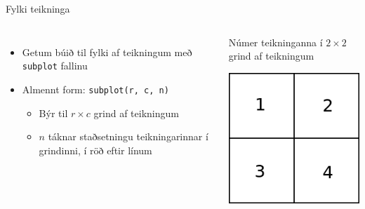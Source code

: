 \documentclass[handout]{beamer}
\begin{document}
\begin{frame}{Fylki teikninga}
\begin{columns}
\begin{itemize}
 \item Getum búið til fylki af teikningum með \texttt{subplot} fallinu
 \item Almennt form: \texttt{subplot(r, c, n)}
 \begin{itemize}
  \item Býr til $r \times c$ grind af teikningum
  \item $n$ táknar staðsetningu teikningarinnar í grindinni, í röð eftir línum
 \end{itemize}
\end{itemize}
\begin{center}
Númer teikninganna í $2 \times 2$ grind af teikningum

\includegraphics[width=0.8\linewidth]{Pics/subplotgrid}
\end{center}
\end{columns}
\end{frame}
\end{document}

